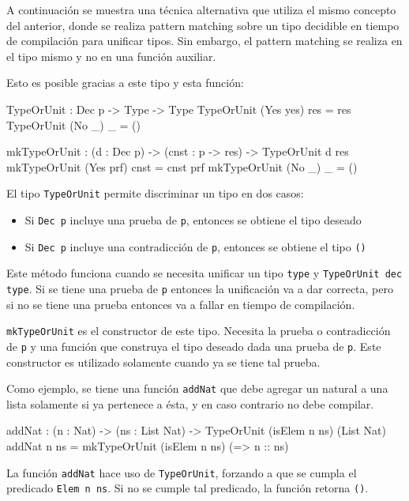 A continuación se muestra una técnica alternativa que utiliza el mismo concepto del anterior, donde se realiza pattern matching sobre un tipo decidible en tiempo de compilación para unificar tipos. Sin embargo, el pattern matching se realiza en el tipo mismo y no en una función auxiliar.

Esto es posible gracias a este tipo y esta función:

\begin{code}
TypeOrUnit : Dec p -> Type -> Type
TypeOrUnit (Yes yes) res = res
TypeOrUnit (No _) _ = ()

mkTypeOrUnit : (d : Dec p) -> (cnst : p -> res) ->
  TypeOrUnit d res
mkTypeOrUnit (Yes prf) cnst = cnst prf
mkTypeOrUnit (No _) _ = ()
\end{code}

El tipo \texttt{TypeOrUnit} permite discriminar un tipo en dos casos:
\begin{itemize}
\item Si \texttt{Dec p} incluye una prueba de \texttt{p}, entonces se obtiene el tipo deseado
\item Si \texttt{Dec p} incluye una contradicción de \texttt{p}, entonces se obtiene el tipo \texttt{()}
\end{itemize}

Este método funciona cuando se necesita unificar un tipo \texttt{type} y \texttt{TypeOrUnit dec type}. Si se tiene una prueba de \texttt{p} entonces la unificación va a dar correcta, pero si no se tiene una prueba entonces va a fallar en tiempo de compilación.

\texttt{mkTypeOrUnit} es el constructor de este tipo. Necesita la prueba o contradicción de \texttt{p} y una función que construya el tipo deseado dada una prueba de \texttt{p}. Este constructor es utilizado solamente cuando ya se tiene tal prueba.

Como ejemplo, se tiene una función \texttt{addNat} que debe agregar un natural a una lista solamente si ya pertenece a ésta, y en caso contrario no debe compilar.

\begin{code}
addNat : (n : Nat) -> (ns : List Nat) ->
  TypeOrUnit (isElem n ns) (List Nat)
addNat n ns = mkTypeOrUnit (isElem n ns)
  (\isElem => n :: ns)
\end{code}

La función \texttt{addNat} hace uso de \texttt{TypeOrUnit}, forzando a que se cumpla el predicado \texttt{Elem n ns}. Si no se cumple tal predicado, la función retorna \texttt{()}.

